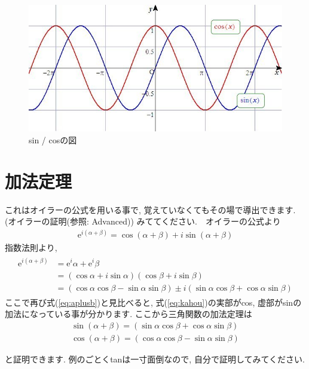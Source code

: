 \documentclass[11pt,a4paper]{jreport}
\begin{document}
\begin{figure}[H]
\label{im:sincos}
  \centering
  \includegraphics[width=120mm,bb=0 0 601 301]{figures/sincos.jpg}
  \caption{sin / cosの図}
\end{figure}

\section{加法定理\label{addition_theorem}}
これはオイラーの公式を用いる事で, 覚えていなくてもその場で導出できます. (オイラーの証明(参照: Advanced)) みててください.　オイラーの公式より
\begin{eqnarray}
\mathrm{e}^{i(\alpha + \beta)} = \cos (\alpha + \beta) + i\sin (\alpha + \beta)
\label{eq:aplusb}
\end{eqnarray}
指数法則より,
\begin{eqnarray}
\begin{split}
\mathrm{e}^{i(\alpha + \beta)} &= \mathrm{e}^i\alpha + \mathrm{e}^i\beta \\ &= (\cos \alpha + i\sin\alpha)(\cos\beta + i\sin\beta) \\
&= (\cos\alpha\cos\beta - \sin\alpha\sin\beta)\pm i(\sin\alpha\cos\beta + \cos\alpha\sin\beta)
\end{split}
\label{eq:kahou}
\end{eqnarray}
ここで再び式(\ref{eq:aplusb})と見比べると, 式(\ref{eq:kahou})の実部がcos, 虚部がsinの加法になっている事が分かります. ここから三角関数の加法定理は
\begin{eqnarray}
\sin (\alpha + \beta) = (\sin\alpha\cos\beta + \cos\alpha\sin\beta)\\
\cos (\alpha + \beta) = (\cos\alpha\cos\beta - \sin\alpha\sin\beta)
\label{kahouteiri}
\end{eqnarray}

と証明できます. 例のごとくtanは一寸面倒なので, 自分で証明してみてください.
\end{document}
